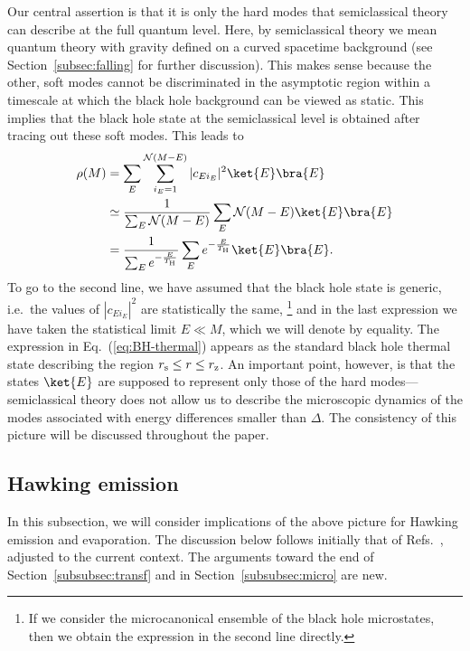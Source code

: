 \documentclass[12pt]{article}
\begin{document}
Our central assertion is that it is only the hard modes that 
semiclassical theory can describe at the full quantum level.  Here, 
by semiclassical theory we mean quantum theory with gravity defined 
on a curved spacetime background (see Section~\ref{subsec:falling} 
for further discussion).  This makes sense because the other, 
soft modes cannot be discriminated in the asymptotic region 
within a timescale at which the black hole background can be 
viewed as static.  This implies that the black hole state at 
the semiclassical level is obtained after tracing out these soft 
modes.  This leads to
%
\begin{align}
  \rho(M) &= \sum_E \sum_{i_E = 1}^{{\cal N}(M-E)} 
    |c_{E i_E}|^2 \ket{E} \bra{E} 
\nonumber\\
  &\simeq \frac{1}{\sum_E {\cal N}(M-E)} 
    \sum_E {\cal N}(M-E) \ket{E} \bra{E} 
\nonumber\\
  &= \frac{1}{\sum_E e^{-\frac{E}{T_{\rm H}}}} 
    \sum_E e^{-\frac{E}{T_{\rm H}}} \ket{E} \bra{E}.
\label{eq:BH-thermal}
\end{align}
%
To go to the second line, we have assumed that the black hole state 
is generic, i.e.\ the values of $|c_{E i_E}|^2$ are statistically 
the same,%
\footnote{If we consider the microcanonical ensemble of the black 
 hole microstates, then we obtain the expression in the second 
 line directly.}
and in the last expression we have taken the statistical limit 
$E \ll M$, which we will denote by equality.  The expression 
in Eq.~(\ref{eq:BH-thermal}) appears as the standard black 
hole thermal state describing the region $r_{\rm s} \leq r \leq 
r_{\rm z}$.  An important point, however, is that the states 
$\ket{E}$ are supposed to represent only those of the hard 
modes---semiclassical theory does not allow us to describe 
the microscopic dynamics of the modes associated with energy 
differences smaller than $\Delta$.  The consistency of this 
picture will be discussed throughout the paper.


\subsection{Hawking emission}
\label{subsec:Hawking}

In this subsection, we will consider implications of the above 
picture for Hawking emission and evaporation.  The discussion 
below follows initially that of Refs.~\cite{Nomura:2014woa,%
Nomura:2014voa,Nomura:2016qum}, adjusted to the current context. 
The arguments toward the end of Section~\ref{subsubsec:transf} 
and in Section~\ref{subsubsec:micro} are new.
\end{document}
